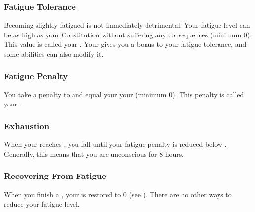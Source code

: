             \subsubsection{Fatigue Tolerance}\label{Fatigue Tolerance}
                Becoming slightly fatigued is not immediately detrimental.
                Your fatigue level can be as high as your Constitution without suffering any consequences (minimum 0).
                This value is called your .
                Your  gives you a bonus to your fatigue tolerance, and some abilities can also modify it.

            \subsubsection{Fatigue Penalty}\label{Fatigue Penalty}
                You take a penalty to  and  equal your  \sub your  (minimum 0).
                This penalty is called your .

        \subsubsection{Exhaustion}\label{Exhaustion}
            When your  reaches , you fall \unconscious until your fatigue penalty is reduced below .
            Generally, this means that you are unconscious for 8 hours.

        \subsubsection{Recovering From Fatigue}
            When you finish a , your  is restored to 0 (see ).
            There are no other ways to reduce your fatigue level.



